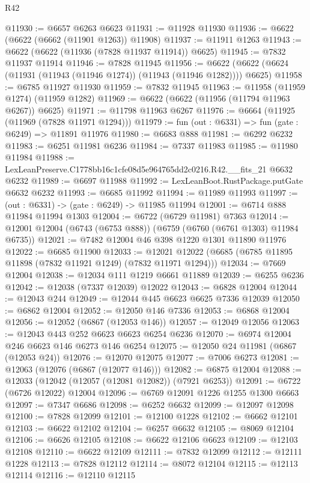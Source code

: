 \begin{lexlean}{R42}
\begin{coremodule}
{@11930 := @6657 @6263 @6623
@11931 := @11928 @11930
@11936 := @6622 (@6622 (@6662 (@11901 @1263)) @11908)
@11937 := @11911 @1263
@11943 := @6622 (@6622 (@11936 (@7828 @11937 @11914)) @6625)
@11945 := @7832 @11937 @11914
@11946 := @7828 @11945
@11956 := @6622 (@6622 (@6624 (@11931 (@11943 (@11946 @1274)) (@11943 (@11946 @1282)))) @6625)
@11958 := @6785 @11927 @11930
@11959 := @7832 @11945
@11963 := @11958 (@11959 @1274) (@11959 @1282)
@11969 := @6622 (@6622 (@11956 (@11794 @11963 @6267)) @6625)
@11971 := @11798 @11963 @6267
@11976 := @6664 (@11925 (@11969 (@7828 @11971 @1294)))
@11979 := fun (out : @6331) => fun (gate : @6249) => @11891 @11976
@11980 := @6683 @888
@11981 := @6292 @6232
@11983 := @6251 @11981 @6236
@11984 := @7337 @11983
@11985 := @11980 @11984
@11988 := LexLeanPreserve.C1778bb16c1cfe08d5e964765dd2c0216.R42.__fits_21 @6632 @6232
@11989 := @6697 @11988
@11992 := LexLeanBoot.RustPackage.putGate @6632 @6232
@11993 := @6685 @11992
@11994 := @11989 @11993
@11997 := (out : @6331) -> (gate : @6249) -> @11985 @11994
@12001 := @6714 @888 @11984 @11994 @1303
@12004 := @6722 (@6729 @11981) @7363
@12014 := @12001 @12004 (@6743 (@6753 @888)) (@6759 (@6760 (@6761 @1303) @11984 @6735))
@12021 := @7482 @12004 @46 @398 @1220 @1301 @11890 @11976
@12022 := @6685 @11900
@12033 := @12021 @12022 (@6685 (@6785 @11895 @11898 (@7832 @11921 @1249) (@7832 @11971 @1294)))
@12034 := @7669 @12004
@12038 := @12034 @111 @1219 @6661 @11889
@12039 := @6255 @6236
@12042 := @12038 (@7337 @12039) @12022
@12043 := @6828 @12004
@12044 := @12043 @244
@12049 := @12044 @445 @6623 @6625 @7336 @12039
@12050 := @6862 @12004
@12052 := @12050 @146 @7336
@12053 := @6868 @12004
@12056 := @12052 (@6867 (@12053 @146))
@12057 := @12049 @12056
@12063 := @12043 @443 @252 @6623 @6623 @6254 @6236
@12070 := @6974 @12004 @246 @6623 @146 @6273 @146 @6254
@12075 := @12050 @24 @11981 (@6867 (@12053 @24))
@12076 := @12070 @12075
@12077 := @7006 @6273
@12081 := @12063 (@12076 (@6867 (@12077 @146)))
@12082 := @6875 @12004
@12088 := @12033 (@12042 (@12057 (@12081 @12082)) (@7921 @6253))
@12091 := @6722 (@6726 @12022) @12004
@12096 := @6769 @12091 @1226 @1255 @1300 @6663
@12097 := @7347 @6686
@12098 := @6252 @6632
@12099 := @12097 @12098
@12100 := @7828 @12099
@12101 := @12100 @1228
@12102 := @6662 @12101
@12103 := @6622 @12102
@12104 := @6257 @6632
@12105 := @8069 @12104
@12106 := @6626 @12105
@12108 := @6622 @12106 @6623
@12109 := @12103 @12108
@12110 := @6622 @12109
@12111 := @7832 @12099
@12112 := @12111 @1228
@12113 := @7828 @12112
@12114 := @8072 @12104
@12115 := @12113 @12114
@12116 := @12110 @12115
}
\end{coremodule}
\end{lexlean}
